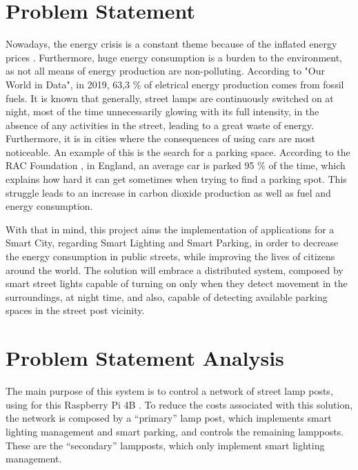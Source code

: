 \section{Problem Statement}
Nowadays, the energy crisis is a constant theme because of the inflated energy prices \cite{energy_crisis}. Furthermore, huge energy consumption is a burden to the environment, as not all means of energy production are non-polluting. According to "Our World in Data"\cite{owidenergy}, in 2019, 63,3 \% of eletrical energy production comes from fossil fuels. It is known that generally, street lamps are continuously switched on at night, most of the time unnecessarily glowing with its full intensity, in the absence of any activities in the street, leading to a great waste of energy. Furthermore, it is in cities where the consequences of using cars are most noticeable. An example of this is the search for a parking space. According to the RAC Foundation \cite{cars_parked}, in England, an average car is parked 95 \% of the time, which explains how hard it can get sometimes when trying to find a parking spot. This struggle leads to an increase in carbon dioxide production as well as fuel and energy consumption.

With that in mind, this project aims the implementation of applications for a Smart City, regarding Smart Lighting and Smart Parking, in order to decrease the energy consumption in public streets, while improving the lives of citizens around the world. The solution will embrace a distributed system, composed by smart street lights capable of turning on only when they detect movement in the surroundings, at night time, and also, capable of detecting available parking spaces in the street post vicinity.

\clearpage
\section{Problem Statement Analysis}
The main purpose of this system is to control a network of street lamp posts, using for this Raspberry Pi 4B \cite{rasp_pi}. To reduce the costs associated with this solution, the network is composed by a “primary” lamp post, which implements smart lighting management and smart parking, and controls the remaining lampposts. These are the “secondary” lampposts, which only implement smart lighting management.

